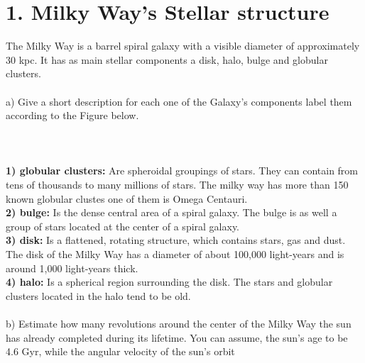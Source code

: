 \section*{1. Milky Way's Stellar structure}

The Milky Way is a barrel spiral galaxy with a visible diameter of approximately 30 kpc. It has as main
stellar components a disk, halo, bulge and globular clusters.\\
\\
a) Give a short description for each one of the Galaxy's components label them according to the Figure
below.\\
\\
\noindent{}\\
\\
\textbf{1) globular clusters:} Are spheroidal groupings of stars. They can contain from tens of thousands
to many millions of stars. The milky way has more than 150 known globular clustes one of them is Omega 
Centauri.\\
\textbf{2) bulge:} Is the dense central area of a spiral galaxy. The bulge is as well a group of stars 
located at the center of a spiral galaxy.\\
\textbf{3) disk:} Is a flattened, rotating structure, which contains stars, gas and dust. The disk of the
Milky Way has a diameter of about 100,000 light-years and is around 1,000 light-years thick.\\
\textbf{4) halo:} Is a spherical region surrounding the disk. The stars and globular clusters located in
the halo tend to be old.\\
\\
b) Estimate how many revolutions around the center of the Milky Way the sun has already completed during
its lifetime. You can assume, the sun's age to be 4.6 Gyr, while the angular velocity of the sun's orbit
